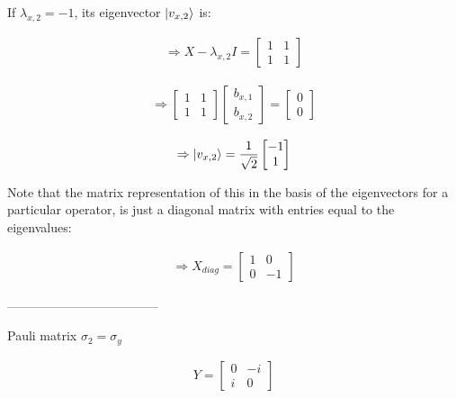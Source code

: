 If $\lambda_{x,2}=-1$, its eigenvector $\ket{v_{x,2}}$ is:

\begin{align}
  \label{eq:2.11.7}
  \Rightarrow X-\lambda_{x,2} I
  =
  \begin{bmatrix}
    1 & 1 \\
    1 & 1
  \end{bmatrix} 
\end{align}

\begin{align}
  \label{eq:2.11.8}
  \Rightarrow
  \begin{bmatrix}
    1 & 1 \\
    1 & 1
  \end{bmatrix}
  \begin{bmatrix}
    b_{x,1} \\
    b_{x,2}
  \end{bmatrix}
  =
  \begin{bmatrix}
    0 \\
    0
  \end{bmatrix}
\end{align}

\begin{align}
  \label{eq:2.11.9}
  \Rightarrow \ket{v_{x,2}} = \frac{1}{\sqrt{2}}
  \begin{bmatrix}
    -1 \\
    1
  \end{bmatrix} 
\end{align}

Note that the matrix representation of this in the basis of the eigenvectors for a particular operator, is just a diagonal matrix with entries equal to the eigenvalues:

\begin{align}
  \label{eq:2.11.10}
  \Rightarrow X_{diag} =
  \begin{bmatrix}
    1 & 0 \\
    0 & -1
  \end{bmatrix} 
\end{align}


------------------------------------

Pauli matrix $\sigma_2=\sigma_y$

\begin{align}
  \label{eq:2.11.11}
  Y=
  \begin{bmatrix}
    0 & -i \\
    i & 0
  \end{bmatrix}
\end{align}

